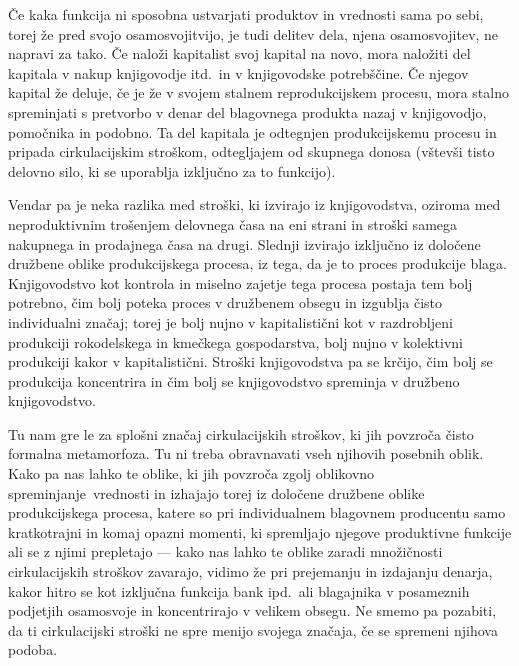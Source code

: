 \documentclass[kapital_02.tex]{subfiles}
\begin{document}
Če kaka funkcija ni sposobna ustvarjati produktov in vrednosti sama po sebi, torej že pred svojo osamosvojitvijo, je tudi delitev dela, njena osamosvojitev, ne napravi za tako.
Če naloži kapitalist svoj kapital na novo, mora naložiti del kapitala v nakup knjigovodje itd.\ in v knjigovodske potrebščine.
Če njegov kapital že deluje, če je že v svojem stalnem reprodukcijskem procesu, mora stalno spreminjati s pretvorbo v denar del blagovnega produkta nazaj v knjigovodjo, pomočnika in podobno.
Ta del kapitala je odtegnjen produkcijskemu procesu in pripada cirkulacijskim stroškom, odtegljajem od skupnega donosa (vštevši tisto delovno silo, ki se uporablja izključno za to funkcijo).

Vendar pa je neka razlika med stroški, ki izvirajo iz knjigovodstva, oziroma med neproduktivnim trošenjem delovnega časa na eni strani in stroški samega nakupnega in prodajnega časa na drugi.
Slednji izvirajo izključno iz določene družbene oblike produkcijskega procesa, iz tega, da je to proces produkcije blaga.
Knjigovodstvo kot kontrola in miselno zajetje tega procesa postaja tem bolj potrebno, čim bolj poteka proces v družbenem obsegu in izgublja čisto individualni značaj; torej je bolj nujno v kapitalistični kot v razdrobljeni produkciji rokodelskega in kmečkega gospodarstva, bolj nujno v kolektivni produkciji kakor v kapitalistični.
Stroški knjigovodstva pa se krčijo, čim bolj se produkcija koncentrira in čim bolj se knjigovodstvo spreminja v družbeno knjigovodstvo.

Tu nam gre le za splošni značaj cirkulacijskih stroškov, ki jih povzroča čisto formalna metamorfoza.
Tu ni treba obravnavati vseh njihovih posebnih oblik.
Kako pa nas lahko te oblike, ki jih povzroča zgolj oblikovno spreminjanje\KPEstran\ vrednosti in izhajajo torej iz določene družbene oblike produkcijskega procesa, katere so pri individualnem blagovnem producentu samo kratkotrajni in komaj opazni momenti, ki spremljajo njegove produktivne funkcije ali se z njimi prepletajo — kako nas lahko te oblike zaradi množičnosti cirkulacijskih stroškov zavarajo, vidimo že pri prejemanju in izdajanju denarja, kakor hitro se kot izključna funkcija bank ipd.\ ali blagajnika v posameznih podjetjih osamosvoje in koncentrirajo v velikem obsegu.
Ne smemo pa pozabiti, da ti cirkulacijski stroški ne spre menijo svojega značaja, če se spremeni njihova podoba. 
\end{document}
